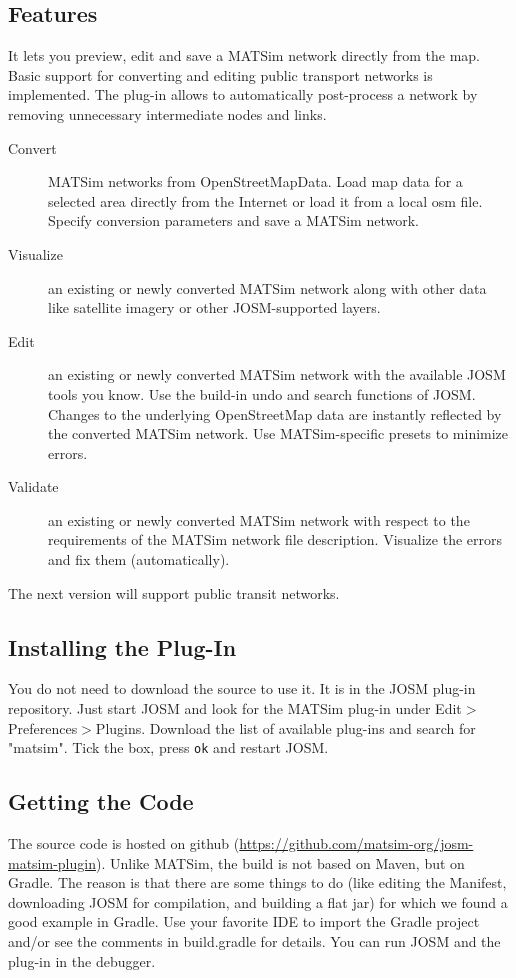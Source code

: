 \subsection{Features}
It lets you preview, edit and save a MATSim network directly from the map. Basic support for converting and editing public transport networks is implemented. The plug-in allows to automatically post-process a network by removing unnecessary intermediate nodes and links.
\begin{description}
\item[Convert] MATSim networks from OpenStreetMapData. Load map data for a selected area directly from the Internet or load it from a local osm file. Specify conversion parameters and save a MATSim network.
\item[Visualize] an existing or newly converted MATSim network along with other data like satellite imagery or other JOSM-supported layers.
\item[Edit] an existing or newly converted MATSim network with the available JOSM tools you know. Use the build-in undo and search functions of JOSM. Changes to the underlying OpenStreetMap data are instantly reflected by the converted MATSim network. Use MATSim-specific presets to minimize errors.
\item[Validate] an existing or newly converted MATSim network with respect to the requirements of the MATSim network file description. Visualize the errors and fix them (automatically). 
\end{description}
The next version will support public transit networks.

\subsection{Installing the Plug-In}
You do not need to download the source to use it. It is in the JOSM plug-in repository. Just start JOSM and look for the MATSim plug-in under Edit$>$Preferences$>$Plugins. Download the list of available plug-ins and search for "matsim". Tick the box, press \lstinline|ok| and restart JOSM.

\subsection{Getting the Code}
The source code is hosted on github (\url{https://github.com/matsim-org/josm-matsim-plugin}). Unlike MATSim, the build is not based on Maven, but on Gradle. The reason is that there are some things to do (like editing the Manifest, downloading JOSM for compilation, and building a flat jar) for which we found a good example in Gradle. Use your favorite IDE to import the Gradle project and/or see the comments in build.gradle for details. You can run JOSM and the plug-in in the debugger.
 
